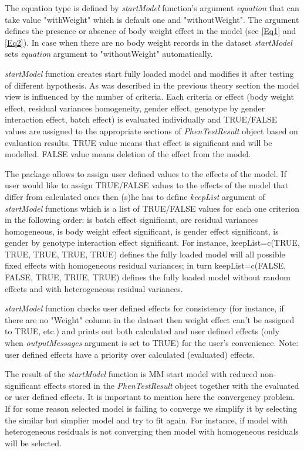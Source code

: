 \documentclass[12pt,a4paper]{article}
\begin{document}
The equation type is defined by \textit{startModel} function's argument \textit{equation} that can take value "withWeight" which is default one and "withoutWeight". The argument defines the presence or absence of body weight effect in the model (see \ref{Eq1} and \ref{Eq2}). 
In case when there are no body weight records in the dataset \textit{startModel} sets \textit{equation} argument to "withoutWeight" automatically.


\textit{startModel} function creates start fully loaded model and modifies it after testing of different hypothesis. 
As was described in the previous theory section the model view is influenced by the number of criteria. 
Each criteria or effect (body weight effect, residual variances homogeneity, gender effect, genotype by gender interaction effect, batch effect) is evaluated individually
and TRUE/FALSE values are assigned to the appropriate sections of \textit{PhenTestResult} object based on evaluation results. 
TRUE value means that effect is significant and will be modelled. FALSE value means deletion of the effect from the model.

The package allows to assign user defined values to the effects of the model. 
If user would like to assign TRUE/FALSE values to the effects of the model that differ from calculated ones then (s)he has to define \textit{keepList} argument of \textit{startModel} functions 
which is a list of TRUE/FALSE values for each one criterion in the following order: is batch effect significant, are residual variances homogeneous, is body weight effect significant, 
is gender effect significant, is gender by genotype interaction effect significant. 
For instance, keepList=c(TRUE, TRUE, TRUE, TRUE, TRUE) defines the fully loaded model will all possible fixed effects with homogeneous residual variances; 
in turn keepList=c(FALSE, FALSE, TRUE, TRUE, TRUE) defines the fully loaded model without random effects and with heterogeneous residual variances.

\textit{startModel} function checks user defined effects for consistency (for instance, if there are no "Weight" column in the dataset then weight effect can't be assigned to TRUE, etc.)
and prints out both calculated and user defined effects (only when \textit{outputMessages} argument is set to TRUE) for the user's convenience. Note: user defined effects have a priority over calculated (evaluated) effects.

The result of the \textit{startModel} function is MM start model with reduced non-significant effects stored in the \textit{PhenTestResult} object together with the evaluated or user defined effects.
It is important to mention here the convergency problem. If for some reason selected model is failing to converge we simplify it by selecting the similar but simplier model and try to fit again. 
For instance, if model with heterogeneous residuals is not converging then model with homogeneous residuals will be selected.
\end{document}
